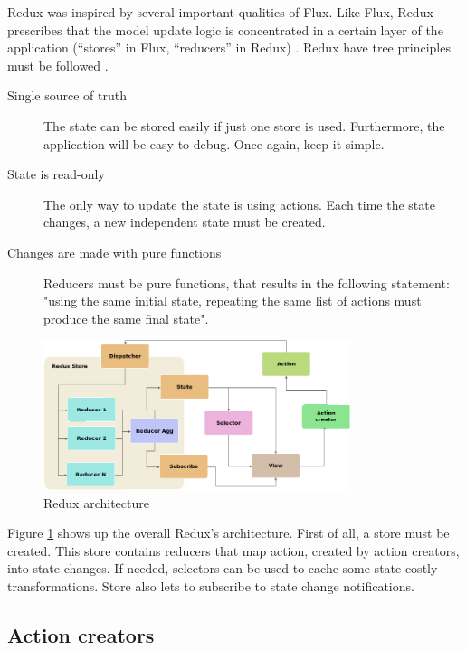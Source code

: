 Redux was inspired by several important qualities of Flux. Like Flux, Redux
prescribes that the model update logic is concentrated in a certain layer of
the application (“stores” in Flux, “reducers” in Redux) \cite{redux-prior-art}.
Redux have tree principles must be followed \cite{redux-principles}.

\begin{description}
	\item [Single source of truth]
	The state can be stored easily if just one store is used. Furthermore, the
	application will be easy to debug. Once again, keep it simple.
	
	\item [State is read-only]
	The only way to update the state is using actions. Each time the state
	changes, a new independent state must be created.

	\item [Changes are made with pure functions]
	Reducers must be pure functions, that results in the following statement:
	"using the same initial state, repeating the same list of actions must
	produce the same final state".

\end{description}

\begin{figure}[htb]
	\begin{center}
		\includegraphics[width=0.8\textwidth]{./figures/redux.png}
		\caption{Redux architecture}
		\label{F:redux-architecture}
	\end{center}
\end{figure}

Figure \ref{F:redux-architecture} shows up the overall Redux's architecture.
First of all, a store must be created. This store contains reducers that map
action, created by action creators, into state changes. If needed, selectors
can be used to cache some state costly transformations. Store also lets 
to subscribe to state change notifications.

\subsection{Action creators}

